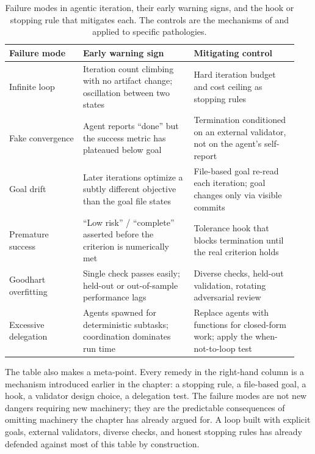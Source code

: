 \begin{table}[t]
\centering
\caption{Failure modes in agentic iteration, their early warning signs, and the
hook or stopping rule that mitigates each. The controls are the mechanisms of
 and  applied to
specific pathologies.}
\label{tab:failure-remedies}
\small
\begin{tabular}{@{}p{0.24\linewidth}p{0.36\linewidth}p{0.34\linewidth}@{}}
\toprule
\textbf{Failure mode} & \textbf{Early warning sign} & \textbf{Mitigating control} \\
\midrule
Infinite loop &
Iteration count climbing with no artifact change; oscillation between two states &
Hard iteration budget and cost ceiling as stopping rules \\
\addlinespace
Fake convergence &
Agent reports ``done'' but the success metric has plateaued below goal &
Termination conditioned on an external validator, not on the agent's self-report \\
\addlinespace
Goal drift &
Later iterations optimize a subtly different objective than the goal file states &
File-based goal re-read each iteration; goal changes only via visible commits \\
\addlinespace
Premature success &
``Low risk'' / ``complete'' asserted before the criterion is numerically met &
Tolerance hook that blocks termination until the real criterion holds \\
\addlinespace
Goodhart overfitting &
Single check passes easily; held-out or out-of-sample performance lags &
Diverse checks, held-out validation, rotating adversarial review \\
\addlinespace
Excessive delegation &
Agents spawned for deterministic subtasks; coordination dominates run time &
Replace agents with functions for closed-form work; apply the when-not-to-loop test \\
\bottomrule
\end{tabular}
\end{table}

The table also makes a meta-point. Every remedy in the right-hand column is a
mechanism introduced earlier in the chapter: a stopping rule, a file-based
goal, a hook, a validator design choice, a delegation test. The failure modes are
not new dangers requiring new machinery; they are the predictable consequences of
omitting machinery the chapter has already argued for. A loop built with explicit
goals, external validators, diverse checks, and honest stopping rules has already
defended against most of this table by construction.

